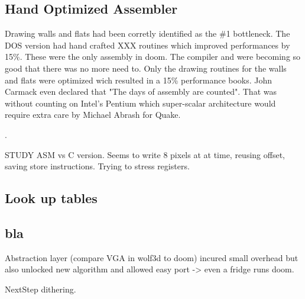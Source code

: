 \subsection{Hand Optimized Assembler}
Drawing walls and flats had been corretly identified as the \#1 bottleneck. The DOS version had hand crafted XXX routines which improved performances by 15\%. These were the only assembly in doom. The compiler and  were becoming so good that there was no more need to. Only the drawing routines for the walls and flats were optimized wich resulted in a 15\% performance books. John Carmack even declared that "The days of assembly are counted". That was without counting on Intel's Pentium which super-scalar architecture would require extra care by Michael Abrash for Quake.\\
\par
 .
 \par
 STUDY ASM vs C version. Seems to write 8 pixels at at time, reusing offset, saving store instructions. Trying to stress registers.\\
 \par

\subsection{Look up tables}
\subsection{bla}
\par

Abstraction layer (compare VGA in wolf3d to doom) incured small overhead but also unlocked new algorithm and allowed easy port -> even a fridge runs doom.\\
\par
NextStep dithering.\\
\\ 


\par
{}




